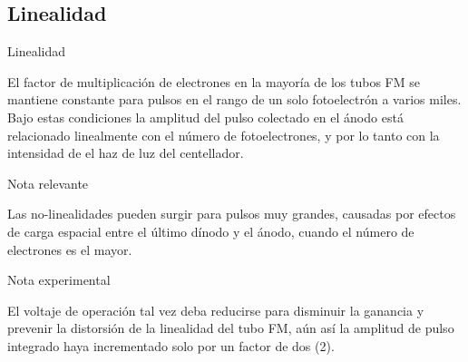 \documentclass[a4paper,10pt]{beamer}
\begin{document}
\subsection{Linealidad}
\begin{frame}{Linealidad}
 
  \begin{justify}
  El factor de multiplicación de electrones en la mayoría de los tubos FM se mantiene 
  constante para pulsos en el rango de un solo fotoelectrón a varios miles. Bajo estas 
  condiciones la amplitud del pulso colectado en el ánodo está relacionado linealmente 
  con el número de fotoelectrones, y por lo tanto con la intensidad de el haz de 
  luz del centellador.
  \end{justify}
  
  \begin{block}{Nota relevante}
  \begin{justify}
   Las no-linealidades pueden surgir para pulsos muy grandes, causadas por efectos 
   de carga espacial entre el último dínodo y el ánodo, cuando el número de electrones 
   es el mayor.
   \end{justify}
  \end{block}
  
  \begin{exampleblock}{Nota experimental}
   \begin{justify}
    El voltaje de operación tal vez deba reducirse para disminuir la ganancia y prevenir 
    la distorsión de la linealidad del tubo FM, aún así la amplitud de pulso integrado 
    haya incrementado solo por un factor de dos (2).
   \end{justify}
  \end{exampleblock}
 
\end{frame}
\end{document}

